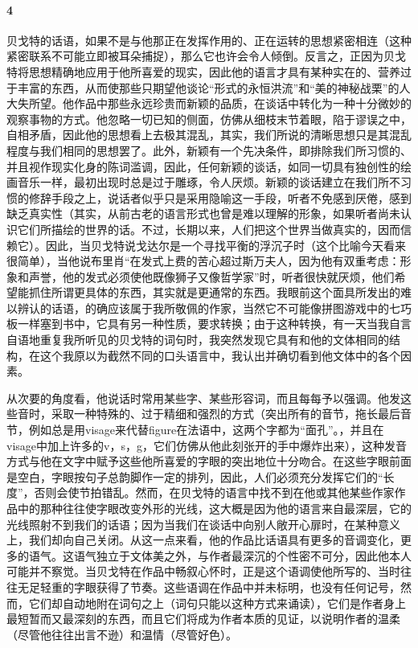 \paragraph*{4}

\par 贝戈特的话语，如果不是与他那正在发挥作用的、正在运转的思想紧密相连（这种紧密联系不可能立即被耳朵捕捉），那么它也许会令人倾倒。反言之，正因为贝戈特将思想精确地应用于他所喜爱的现实，因此他的语言才具有某种实在的、营养过于丰富的东西，从而使那些只期望他谈论“形式的永恒洪流”和“美的神秘战栗”的人大失所望。他作品中那些永远珍贵而新颖的品质，在谈话中转化为一种十分微妙的观察事物的方式。他忽略一切已知的侧面，仿佛从细枝末节着眼，陷于谬误之中，自相矛盾，因此他的思想看上去极其混乱，其实，我们所说的清晰思想只是其混乱程度与我们相同的思想罢了。此外，新颖有一个先决条件，即排除我们所习惯的、并且视作现实化身的陈词滥调，因此，任何新颖的谈话，如同一切具有独创性的绘画音乐一样，最初出现时总是过于雕琢，令人厌烦。新颖的谈话建立在我们所不习惯的修辞手段之上，说话者似乎只是采用隐喻这一手段，听者不免感到厌倦，感到缺乏真实性（其实，从前古老的语言形式也曾是难以理解的形象，如果听者尚未认识它们所描绘的世界的话。不过，长期以来，人们把这个世界当做真实的，因而信赖它）。因此，当贝戈特说戈达尔是一个寻找平衡的浮沉子时（这个比喻今天看来很简单），当他说布里肖“在发式上费的苦心超过斯万夫人，因为他有双重考虑：形象和声誉，他的发式必须使他既像狮子又像哲学家”时，听者很快就厌烦，他们希望能抓住所谓更具体的东西，其实就是更通常的东西。我眼前这个面具所发出的难以辨认的话语，的确应该属于我所敬佩的作家，当然它不可能像拼图游戏中的七巧板一样塞到书中，它具有另一种性质，要求转换；由于这种转换，有一天当我自言自语地重复我所听见的贝戈特的词句时，我突然发现它具有和他的文体相同的结构，在这个我原以为截然不同的口头语言中，我认出并确切看到他文体中的各个因素。
\par 从次要的角度看，他说话时常用某些字、某些形容词，而且每每予以强调。他发这些音时，采取一种特殊的、过于精细和强烈的方式（突出所有的音节，拖长最后音节，例如总是用visage来代替figure在法语中，这两个字都为“面孔”。，并且在visage中加上许多的v，s，g，它们仿佛从他此刻张开的手中爆炸出来），这种发音方式与他在文字中赋予这些他所喜爱的字眼的突出地位十分吻合。在这些字眼前面是空白，字眼按句子总韵脚作一定的排列，因此，人们必须充分发挥它们的“长度”，否则会使节拍错乱。然而，在贝戈特的语言中找不到在他或其他某些作家作品中的那种往往使字眼改变外形的光线，这大概是因为他的语言来自最深层，它的光线照射不到我们的话语；因为当我们在谈话中向别人敞开心扉时，在某种意义上，我们却向自己关闭。从这一点来看，他的作品比话语具有更多的音调变化，更多的语气。这语气独立于文体美之外，与作者最深沉的个性密不可分，因此他本人可能并不察觉。当贝戈特在作品中畅叙心怀时，正是这个语调使他所写的、当时往往无足轻重的字眼获得了节奏。这些语调在作品中并未标明，也没有任何记号，然而，它们却自动地附在词句之上（词句只能以这种方式来诵读），它们是作者身上最短暂而又最深刻的东西，而且它们将成为作者本质的见证，以说明作者的温柔（尽管他往往出言不逊）和温情（尽管好色）。
